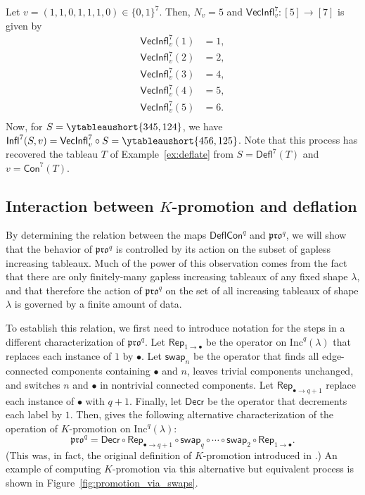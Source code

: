 \documentclass[12pt]{amsart}
\theoremstyle{definition}
\newenvironment{example}
  {\pushQED{\qed}\renewcommand{\qedsymbol}{$\diamondsuit$}\examplex}
  {\popQED\endexamplex}
\theoremstyle{remark}
\numberwithin{equation}{section}
\newcommand{\inc}{\ensuremath{\mathrm{Inc}}}
\newcommand{\pro}{\mathfrak{pro}}
\newcommand{\swap}{\ensuremath{\mathsf{swap}}}
\newcommand{\decr}{\ensuremath{\mathsf{Decr}}}
\newcommand{\rep}{\ensuremath{\mathsf{Rep}}}
\newcommand{\deflate}{\ensuremath{\mathsf{Defl}}}
\newcommand{\inflate}{\ensuremath{\mathsf{VecInfl}}}
\newcommand{\tinflate}{\ensuremath{\mathsf{Infl}}}
\newcommand{\content}{\ensuremath{\mathsf{Con}}}
\newcommand{\compress}{\ensuremath{\mathsf{DeflCon}}}
\begin{document}
\begin{example}\label{ex:reinflate}
Let $v = (1,1,0,1,1,1,0) \in \{0,1\}^7$. Then, $N_v = 5$ and $\inflate^7_v : [5] \to [7]$ is given by 
\begin{align*}
\inflate^7_v(1) &= 1, \\
\inflate^7_v(2) &= 2, \\
\inflate_v^7(3) &= 4, \\
\inflate_v^7(4) &= 5, \\
\inflate_v^7(5) &= 6. \\
\end{align*}
Now, for $S = \ytableaushort{345,124}$, we have $\tinflate^7(S,v) = \inflate^7_v \circ S = \ytableaushort{456,125}$. Note that this process has recovered the tableau $T$ of Example~\ref{ex:deflate} from $S=\deflate^7(T)$ and $v=\content^7(T)$.
\end{example}

\subsection{Interaction between $K$-promotion and deflation}
By determining the relation between the maps $\compress^q$ and $\pro^q$, we will show that the behavior of $\pro^q$ is controlled by its action on the subset of gapless increasing tableaux. Much of the power of this observation comes from the fact that there are only finitely-many gapless increasing tableaux of any fixed shape $\lambda$, and that therefore the action of $\pro^q$ on the set of all increasing tableaux of shape $\lambda$ is governed by a finite amount of data.


To establish this relation, we first need to introduce notation for the steps in a different characterization of $\pro^q$. Let $\rep_{1 \rightarrow \bullet}$ be the operator on $\inc^q(\lambda)$ that replaces each instance of $1$ by $\bullet$. Let $\swap_n$ be the operator that finds all edge-connected components containing $\bullet$ and $n$, leaves trivial components unchanged, and switches $n$ and $\bullet$ in nontrivial connected components. Let $\rep_{\bullet \rightarrow q+1}$ replace each instance of $\bullet$ with $q+1$. Finally, let $\decr$ be the operator that decrements each label by $1$. Then, \cite[Proposition~2.4]{DPS} gives the following alternative characterization of the operation of $K$-promotion on $\inc^q(\lambda)$: 
\begin{equation}\label{eq:kprodef2}
\pro^q = \decr \circ \rep_{\bullet \rightarrow q+1} \circ \swap_q \circ \cdots \circ \swap_2 \circ \rep_{1 \rightarrow \bullet}.
\end{equation}
 (This was, in fact, the original definition of $K$-promotion introduced in \cite{Pechenik}.) An example of computing $K$-promotion via this alternative but equivalent process is shown in Figure~\ref{fig:promotion_via_swaps}.
 
\end{document}
